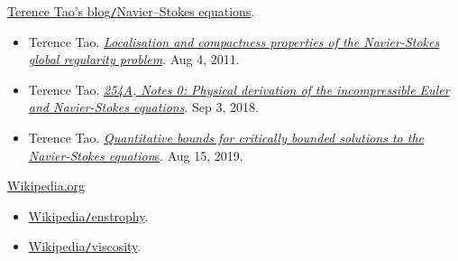 \documentclass{article}
\numberwithin{equation}{section}
\begin{document}
\begin{thebibliography}{99}
	 \href{https://terrytao.wordpress.com/tag/navier-stokes-equations/}{Terence Tao's blog\texttt{/}Navier--Stokes equations}.
	\begin{itemize}
		\item Terence Tao. \href{https://terrytao.wordpress.com/2011/08/04/localisation-and-compactness-properties-of-the-navier-stokes-global-regularity-problem}{\textit{Localisation and compactness properties of the Navier-Stokes global regularity problem}}. Aug 4, 2011.
		
		\item Terence Tao. \href{https://terrytao.wordpress.com/2018/09/03/254a-notes-0-physical-derivation-of-the-incompressible-euler-and-navier-stokes-equations}{\textit{254A, Notes 0: Physical derivation of the incompressible Euler and Navier-Stokes equations}}. Sep 3, 2018.
		
		\item Terence Tao. \href{https://terrytao.wordpress.com/2019/08/15/quantitative-bounds-for-critically-bounded-solutions-to-the-navier-stokes-equations/}{\textit{Quantitative bounds for critically bounded solutions to the Navier-Stokes equation}s}. Aug 15, 2019.
	\end{itemize}
	
	 \href{https://en.wikipedia.org}{Wikipedia.org}
	\begin{itemize}
		\item \href{https://en.wikipedia.org/wiki/Enstrophy}{Wikipedia\texttt{/}enstrophy}.
		\item \href{https://en.wikipedia.org/wiki/Viscosity}{Wikipedia\texttt{/}viscosity}.
	\end{itemize}
\end{thebibliography}

\printbibliography[heading=bibintoc]
	
\end{document}
